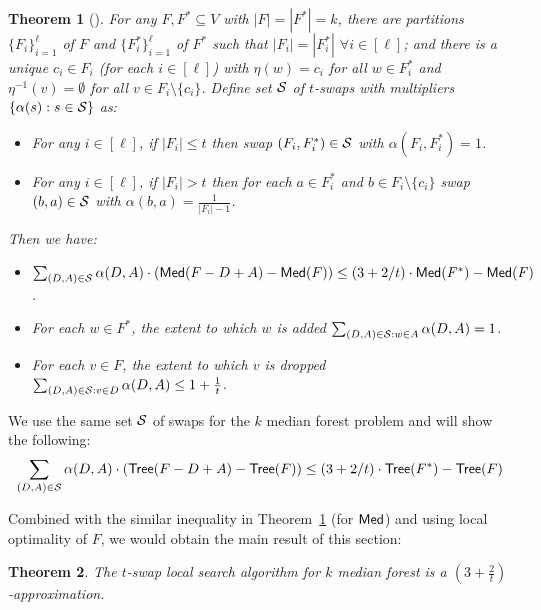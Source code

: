 \documentclass[11pt,twoside,a4paper]{article}
\newtheorem{theorem}{Theorem}
\newcommand{\sse}{\subseteq}
\def\kmf{$k$ median forest\xspace}
\begin{document}
\begin{theorem}[\cite{GT08}] \label{th:GT-swap}
For any $F,F^*\sse V$ with $|F|=|F^*|=k$, there are partitions $\{F_i\}_{i=1}^\ell$ of $F$ and $\{F^*_i\}_{i=1}^\ell$
of $F^*$ such that $|F_i|=|F^*_i|$ $\forall i\in[\ell]$; and there is a unique $c_i\in F_i$ (for each $i\in[\ell]$)
with $\eta(w)=c_i$ for all $w\in F^*_i$ and $\eta^{-1}(v)=\emptyset$ for all $v\in F_i\setminus \{c_i\}$.  Define set
$\mathcal{S}$ of $t$-swaps with multipliers $\{\alpha(s) : s\in \mathcal{S}\}$ as:
\begin{itemize}
 \item For any $i\in[\ell]$, if $|F_i|\le t$ then swap $(F_i, F^*_i)\in \mathcal{S}$ with $\alpha(F_i,F^*_i)=1$.
 \item For any $i\in[\ell]$, if $|F_i|> t$ then for each $a\in F^*_i$ and $b\in F_i\setminus \{c_i\}$ swap $(b,a)\in
 \mathcal{S}$ with $\alpha(b,a)=\frac1{|F_i|-1}$.
\end{itemize}
Then we have:
\begin{itemize}
 \item  $\sum_{(D,A)\in \mathcal{S}} \alpha(D,A)\cdot \left( {\sf Med}(F-D+A)-{\sf Med}(F)\right) \le (3+2/t)\cdot {\sf Med}(F^*) -
{\sf Med}(F)$.
 \item For each $w\in F^*$, the extent to which $w$ is added $\sum_{(D,A)\in \mathcal{S}: w\in A} \alpha(D,A)=1$.
\item For each $v\in F$, the extent to which $v$ is dropped $\sum_{(D,A)\in \mathcal{S}: v\in D} \alpha(D,A)\le 1+\frac1t$.
\end{itemize}
\end{theorem}

We use the same set $\mathcal{S}$ of swaps for the \kmf problem and will show the following:
\begin{equation}\label{eq:tree-swap}
\sum_{(D,A)\in \mathcal{S}} \alpha(D,A)\cdot \left( {\sf Tree}(F-D+A)-{\sf Tree}(F)\right) \le (3+2/t)\cdot {\sf Tree}(F^*) -
{\sf Tree}(F)\end{equation}

Combined with the similar inequality in Theorem~\ref{th:GT-swap} (for ${\sf Med}$) and using local optimality of $F$, we
would obtain the main result of this section:
\begin{theorem} The $t$-swap local search algorithm for \kmf is a $\left(3+\frac2t\right)$-approximation.\end{theorem}
\end{document}
